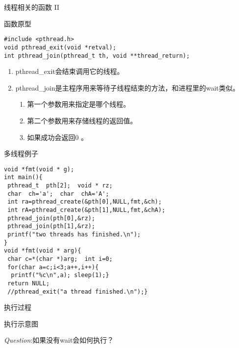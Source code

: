 \documentclass{beamer}
\begin{document}
\begin{frame}[fragile]{线程相关的函数 II}
\begin{block}{函数原型}
\begin{verbatim}
#include <pthread.h>
void pthread_exit(void *retval);
int pthread_join(pthread_t th, void **thread_return);
\end{verbatim}
\begin{enumerate}
\item
pthread\_exit会结束调用它的线程。
\item
pthread\_join是主程序用来等待子线程结束的方法，和进程里的wait类似。
\begin{enumerate}
\item
第一个参数用来指定是哪个线程。
\item
第二个参数用来存储线程的返回值。
\item
如果成功会返回0 。
\end{enumerate}
\end{enumerate}
\end{block}
\end{frame}
\begin{frame}[fragile]{多线程例子}
\begin{verbatim}
void *fmt(void * g);
int main(){
 pthread_t  pth[2];  void * rz;
 char  ch='a';  char  chA='A';
 int ra=pthread_create(&pth[0],NULL,fmt,&ch);
 int rA=pthread_create(&pth[1],NULL,fmt,&chA);
 pthread_join(pth[0],&rz);
 pthread_join(pth[1],&rz);
 printf("two threads has finished.\n");	
}
void *fmt(void * arg){
 char c=*(char *)arg;  int i=0;
 for(char a=c;i<3;a++,i++){
  printf("%c\n",a); sleep(1);}
 return NULL; 
 //pthread_exit("a thread finished.\n");}
\end{verbatim}
\end{frame}
\begin{frame}{执行过程}
\begin{block}{执行示意图}
\end{block}
\emph{Question}:如果没有wait会如何执行？
\end{frame}
\end{document}
